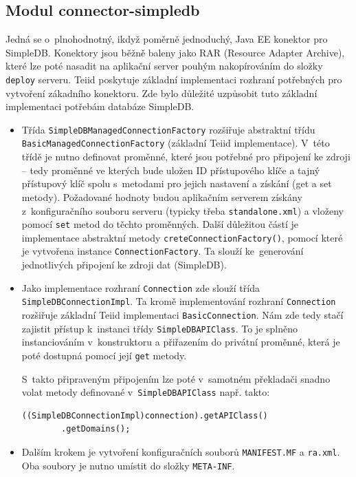 \documentclass[oneside,12pt]{fithesis2}
\begin{document}
\subsection{Modul connector-simpledb}
\label{connector-simpledb}
Jedná se o~plnohodnotný, ikdyž poměrně jednoduchý, Java EE konektor pro SimpleDB. Konektory jsou běžně baleny jako RAR (Resource Adapter Archive), které lze poté nasadit na aplikační server pouhým nakopírováním do složky \texttt{deploy} serveru. Teiid poskytuje základní implementaci rozhraní potřebných pro vytvoření zákadního konektoru. Zde bylo důležité uzpůsobit tuto základní implementaci potřebám databáze SimpleDB. 
\begin{itemize}
 \item Třída \texttt{SimpleDBManagedConnectionFactory} rozšiřuje abstraktní třídu \texttt{BasicManagedConnectionFactory} (základní Teiid implementace). V~této třídě je nutno definovat proměnné, které jsou potřebné pro připojení ke zdroji -- tedy proměnné ve kterých bude uložen ID přístupového klíče a tajný přístupový klíč spolu s~metodami pro jejich nastavení a získání (get a set metody). Požadované hodnoty budou aplikačním serverem získány z~konfiguračního souboru serveru (typicky třeba \texttt{standalone.xml}) a vloženy pomocí 
 \texttt{set} metod do těchto proměnných. Další důležitou částí je implementace abstraktní metody \texttt{creteConnectionFactory()}, pomocí které je vytvořena instance \texttt{ConnectionFactory}. Ta slouží ke~generování jednotlivých připojení ke zdroji dat (SimpleDB).
 
 \item Jako implementace rozhraní \texttt{Connection} zde slouží třída \texttt{SimpleDB\allowbreak ConnectionImpl}. Ta kromě implementování rozhraní \texttt{Connection} rozšiřuje základní Teiid implementaci \texttt{BasicConnection}. Nám zde tedy stačí zajistit přístup k~instanci třídy \texttt{SimpleDBAPIClass}. To je splněno instanciováním v~konstruktoru a přiřazením do privátní proměnné, která je poté dostupná pomocí její \texttt{get} metody.
 
 S~takto připraveným připojením lze poté v~samotném překladači snadno volat metody definované v~\texttt{SimpleDBAPIClass} např. takto:
 \begin{Verbatim}[fontsize=\small]
((SimpleDBConnectionImpl)connection).getAPIClass()
		.getDomains();
 \end{Verbatim}
 \item Dalším krokem je vytvoření konfiguračních souborů \texttt{MANIFEST.MF} a \texttt{ra.xml}. Oba soubory je nutno umístit do složky \texttt{META-INF}. 
 

\end{itemize}
\end{document}
